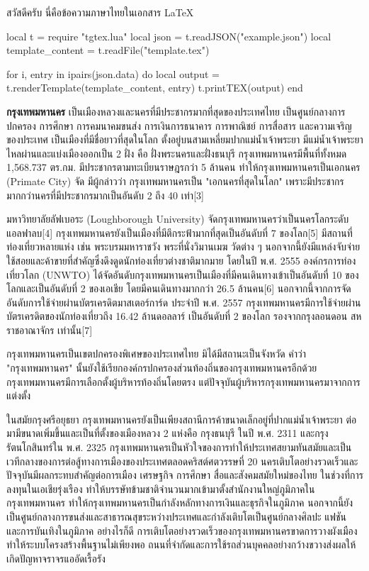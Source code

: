 \documentclass{article}
\begin{document}
สวัสดีครับ นี่คือข้อความภาษาไทยในเอกสาร LaTeX


\begin{luacode*}
local t = require "tgtex.lua"
local json = t.readJSON("example.json")
local template_content = t.readFile("template.tex")

for i, entry in ipairs(json.data) do
  local output = t.renderTemplate(template_content, entry)
  t.printTEX(output)
end
\end{luacode*}

\textbf{กรุงเทพมหานคร} เป็นเมืองหลวงและนครที่มีประชากรมากที่สุดของประเทศไทย เป็นศูนย์กลางการปกครอง การศึกษา การคมนาคมขนส่ง การเงินการธนาคาร การพาณิชย์ การสื่อสาร และความเจริญของประเทศ เป็นเมืองที่มีชื่อยาวที่สุดในโลก ตั้งอยู่บนสามเหลี่ยมปากแม่น้ำเจ้าพระยา มีแม่น้ำเจ้าพระยาไหลผ่านและแบ่งเมืองออกเป็น 2 ฝั่ง คือ ฝั่งพระนครและฝั่งธนบุรี กรุงเทพมหานครมีพื้นที่ทั้งหมด 1,568.737 ตร.กม. มีประชากรตามทะเบียนราษฎรกว่า 5 ล้านคน ทำให้กรุงเทพมหานครเป็นเอกนคร (Primate City) จัด มีผู้กล่าวว่า กรุงเทพมหานครเป็น "เอกนครที่สุดในโลก" เพราะมีประชากรมากกว่านครที่มีประชากรมากเป็นอันดับ 2 ถึง 40 เท่า[3]

มหาวิทยาลัยลัฟเบอระ (Loughborough University) จัดกรุงเทพมหานครว่าเป็นนครโลกระดับแอลฟาลบ[4] กรุงเทพมหานครยังเป็นเมืองที่มีตึกระฟ้ามากที่สุดเป็นอันดับที่ 7 ของโลก[5] มีสถานที่ท่องเที่ยวหลายแห่ง เช่น พระบรมมหาราชวัง พระที่นั่งวิมานเมฆ วัดต่าง ๆ นอกจากนี้ยังมีแหล่งจับจ่ายใช้สอยและค้าขายที่สำคัญซึ่งดึงดูดนักท่องเที่ยวต่างชาติมากมาย โดยในปี พ.ศ. 2555 องค์กรการท่องเที่ยวโลก (UNWTO) ได้จัดอันดับกรุงเทพมหานครเป็นเมืองที่มีคนเดินทางเข้าเป็นอันดับที่ 10 ของโลกและเป็นอันดับที่ 2 ของเอเชีย โดยมีคนเดินทางมากกว่า 26.5 ล้านคน[6] นอกจากนี้จากการจัดอันดับการใช้จ่ายผ่านบัตรเครดิตมาสเตอร์การ์ด ประจำปี พ.ศ. 2557 กรุงเทพมหานครมีการใช้จ่ายผ่านบัตรเครดิตของนักท่องเที่ยวถึง 16.42 ล้านดอลลาร์ เป็นอันดับที่ 2 ของโลก รองจากกรุงลอนดอน สหราชอาณาจักร เท่านั้น[7]

กรุงเทพมหานครเป็นเขตปกครองพิเศษของประเทศไทย มิได้มีสถานะเป็นจังหวัด คำว่า "กรุงเทพมหานคร" นั้นยังใช้เรียกองค์กรปกครองส่วนท้องถิ่นของกรุงเทพมหานครอีกด้วย กรุงเทพมหานครมีการเลือกตั้งผู้บริหารท้องถิ่นโดยตรง แต่ปัจจุบันผู้บริหารกรุงเทพมหานครมาจากการแต่งตั้ง

ในสมัยกรุงศรีอยุธยา กรุงเทพมหานครยังเป็นเพียงสถานีการค้าขนาดเล็กอยู่ที่ปากแม่น้ำเจ้าพระยา ต่อมามีขนาดเพิ่มขึ้นและเป็นที่ตั้งของเมืองหลวง 2 แห่งคือ กรุงธนบุรี ในปี พ.ศ. 2311 และกรุงรัตนโกสินทร์ใน พ.ศ. 2325 กรุงเทพมหานครเป็นหัวใจของการทำให้ประเทศสยามทันสมัยและเป็นเวทีกลางของการต่อสู้ทางการเมืองของประเทศตลอดคริสต์ศตวรรษที่ 20 นครเติบโตอย่างรวดเร็วและปัจจุบันมีผลกระทบสำคัญต่อการเมือง เศรษฐกิจ การศึกษา สื่อและสังคมสมัยใหม่ของไทย ในช่วงที่การลงทุนในเอเชียรุ่งเรือง ทำให้บรรษัทข้ามชาติจำนวนมากเข้ามาตั้งสำนักงานใหญ่ภูมิภาคในกรุงเทพมหานคร ทำให้กรุงเทพมหานครเป็นกำลังหลักทางการเงินและธุรกิจในภูมิภาค นอกจากนี้ยังเป็นศูนย์กลางการขนส่งและสาธารณสุขระหว่างประเทศและกำลังเติบโตเป็นศูนย์กลางศิลปะ แฟชัน และการบันเทิงในภูมิภาค อย่างไรก็ดี การเติบโตอย่างรวดเร็วของกรุงเทพมหานครขาดการวางผังเมือง ทำให้ระบบโครงสร้างพื้นฐานไม่เพียงพอ ถนนที่จำกัดและการใช้รถส่วนบุคคลอย่างกว้างขวางส่งผลให้เกิดปัญหาจราจรแออัดเรื้อรัง
\end{document}
